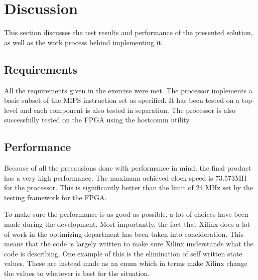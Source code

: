 \section{Discussion}




This section discusses the test results and performance of the presented solution,
as well as the work process behind implementing it.

\subsection{Requirements}
All the requirements given in the exercise were met.
The processor implements a basic subset of the MIPS instruction set \cite[p.64]{compendium} as specified.
It has been tested on a top-level and each component is also tested in separation.
The processor is also successfully tested on the FPGA using the hostcomm \cite{hostcomm} utility.

\subsection{Performance}
Because of all the precausions done with performance in mind, the final product has a very high performance.
The maximum achieved clock speed is 73.573MH for the processor.
This is significantly better than the limit of 24 MHz set by the testing framework for the FPGA.

To make sure the performance is as good as possible, a lot of choices have been made during the development.
Most importantly, the fact that Xilinx does a lot of work in the optimizing department has been taken into concideration.
This means that the code is largely written to make sure Xilinx understands what the code is describing.
One example of this is the elimination of self written state values.
These are instead made as an enum which in terms make Xilinx change the values to whatever is best for the situation.

